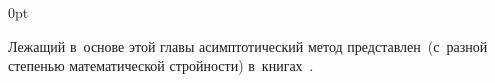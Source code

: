 \section*{\small \wordforbibliography}

\begin{changemargin}{\parindent}{0pt}
\fontsize{10}{12}\selectfont

\begin{otherlanguage}{russian}

Лежащий в~основе этой главы асимптотический метод представлен~(с~разной степенью математической стройности) в~книгах~\cite{bakhvalovpanasenko, kravchuk.mayboroda.urzhumtsev-polymericandcompositematerials, pobedrya-composites, asymptoticanalysisforperiodicstructures}.

\end{otherlanguage}

\end{changemargin}
